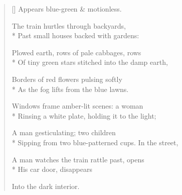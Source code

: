 \label{ch:england}
\settowidth{\versewidth}{Sipping from two blue-patterned cups.\qquad In the street,}
\begin{verse}[\versewidth]
\hspace*{2\vgap} Appears blue-green \& motionless.

The train hurtles through backyards,\\*
Past small houses backed with gardens:

Plowed earth, rows of pale cabbages, rows\\*
Of tiny green stars stitched into the damp earth,

Borders of red flowers pulsing softly\\*
As the fog lifts from the blue lawns.

Windows frame amber-lit scenes: a woman\\*
Rinsing a white plate, holding it to the light;

A man gesticulating; two children\\*
Sipping from two blue-patterned cups. In the street,

A man watches the train rattle past, opens\\*
His car door, disappears

Into the dark interior.
\end{verse}
